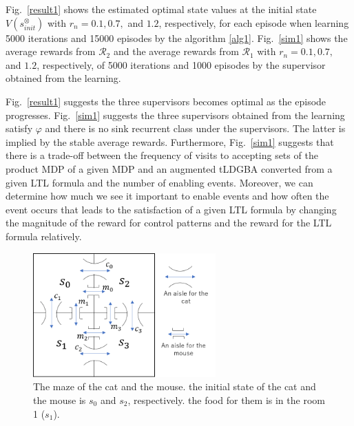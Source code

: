Fig.\ \ref{result1} shows the estimated optimal state values at the initial state $V(s^{\otimes}_{init})$ with $r_{n} = 0.1, 0.7,$ and $1.2$, respectively, for each episode when learning 5000 iterations and 15000 episodes by the algorithm \ref{alg1}.
Fig.\ \ref{sim1} shows the average rewards from $\mathcal{R}_2$ and the average rewards from $\mathcal{R}_1$ with $r_{n} = 0.1, 0.7,$ and $1.2$, respectively, of 5000 iterations and 1000 episodes by the supervisor obtained from the learning.

Fig.\ \ref{result1} suggests the three supervisors becomes optimal as the episode progresses.
Fig.\ \ref{sim1} suggests the three supervisors obtained from the learning satisfy $\varphi$ and there is no sink recurrent class under the supervisors. The latter is implied by the stable average rewards.
Furthermore, Fig.\ \ref{sim1} suggests that there is a trade-off between the frequency of visits to accepting sets of the product MDP of a given MDP and an augmented tLDGBA converted from a given LTL formula and the number of enabling events. Moreover, we can determine how much we see it important to enable events and how often the event occurs that leads to the satisfaction of a given LTL formula by changing the magnitude of the reward for control patterns and the reward for the LTL formula relatively.

\begin{figure}[htbp]
   \centering
   \vspace{2mm}
   \includegraphics[width=7cm]{cat_mouse.png}
   \caption{The maze of the cat and the mouse. the initial state of the cat and the mouse is $s_0$ and $s_2$, respectively. the food for them is in the room 1 ($s_1$).}
   \label{cat_mouse}
\end{figure}

